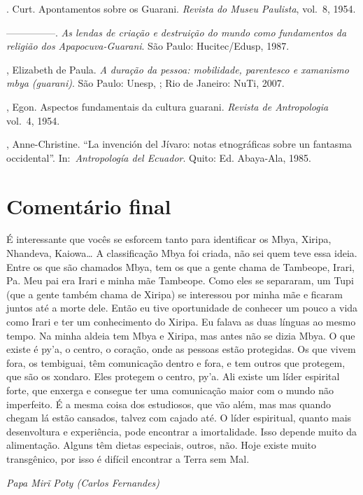 {{\begin{Parskip}
. Curt. Apontamentos sobre os Guarani. \emph{Revista do Museu
Paulista}, vol.~8, 1954.

—————. \emph{As lendas de criação e destruição do mundo como fundamentos da
religião dos Apapocuva-Guarani}. São Paulo: Hucitec/Edusp, 1987.

, Elizabeth de Paula. \emph{A duração da pessoa: mobilidade,
parentesco e xamanismo mbya (guarani)}. São Paulo: Unesp, ; Rio de
Janeiro: NuTi, 2007.

, Egon. Aspectos fundamentais da cultura guarani. \emph{Revista de
Antropologia} vol.~4, 1954.

, Anne-Christine. ``La invención del Jívaro: notas etnográficas
sobre un fantasma occidental''. In:~\emph{Antropología del Ecuador}. Quito: Ed.
Abaya-Ala, 1985.
\end{Parskip}

\section{Comentário final}
É interessante que vocês se esforcem tanto para identificar os Mbya,
Xiripa, Nhandeva, Kaiowa\ldots{} A classificação Mbya foi criada, não sei
quem teve essa ideia. Entre os que são chamados Mbya, tem os que a
gente chama de Tambeope, Irari, Pa. Meu pai era Irari e
minha mãe Tambeope. Como eles se separaram, um Tupi (que a gente também
chama de Xiripa) se interessou por minha mãe e ficaram juntos até a
morte dele. Então eu tive oportunidade de conhecer um pouco a vida como
Irari e ter um conhecimento do Xiripa. Eu falava as duas línguas ao
mesmo tempo. Na minha aldeia tem Mbya e Xiripa, mas antes não se dizia
Mbya. O que existe é py’a, o centro, o coração, onde as pessoas estão
protegidas. Os que vivem fora, os tembiguai, têm comunicação dentro e
fora, e tem outros que protegem, que são os xondaro. Eles protegem o
centro, py’a. Ali existe um líder espirital forte, que enxerga e
consegue ter uma comunicação maior com o mundo não imperfeito. É a
mesma coisa dos estudiosos, que vão além, mas mas quando chegam lá
estão cansados, talvez com cajado até. O líder espiritual, quanto mais
desenvoltura e experiência, pode encontrar a imortalidade. Isso depende
muito da alimentação. Alguns têm dietas especiais, outros, não. Hoje
existe muito transgênico, por isso é difícil encontrar a Terra sem Mal.
\medskip
\begin{flushright}
\emph{Papa Mir\~{i} Poty (Carlos Fernandes)} 
\end{flushright}

}}
